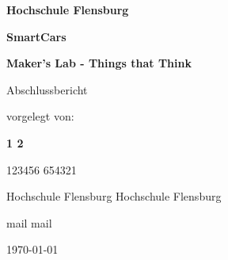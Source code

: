 \documentclass[a4paper, 11pt]{article}
\begin{document}
\begin{titlepage}
    \begin{center}
        {\LARGE\bfseries Hochschule Flensburg \par}
        \vspace{0.5cm}
        {\huge\bfseries SmartCars\par}
        \vspace{0.5cm}
        {\LARGE\bfseries Maker's Lab - Things that Think \par}
        \vspace{0.25cm}
        {\LARGE Abschlussbericht\par}
        \vspace{2cm}
        {\Large vorgelegt von: \par}
        \vspace{1cm}
        {\bfseries 1 \hfill \bfseries 2\par}
        { 123456 \hfill  654321\par}
        { Hochschule Flensburg \hfill Hochschule Flensburg \par}
        { mail \hfill  mail\par}
        \vfill
        \vfill
    
        {\large \today\par}
    \end{center}
\end{titlepage}
    \clearpage
    \thispagestyle{empty}

    \tableofcontents
    \pagebreak

    
\end{document}
